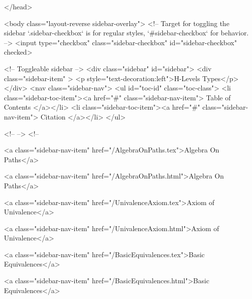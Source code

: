   
</head>




  <body class="layout-reverse sidebar-overlay">
    <!-- Target for toggling the sidebar `.sidebar-checkbox` is for regular
     styles, `#sidebar-checkbox` for behavior. -->
<input type="checkbox" class="sidebar-checkbox" id="sidebar-checkbox" checked>

<!-- Toggleable sidebar -->
<div class="sidebar" id="sidebar">
  <div class="sidebar-item" >
    <p style="text-decoration:left">H-Levels Types</p>
  </div>
  <nav class="sidebar-nav">
    <ul id="toc-id" class="toc-class">
  <li class="sidebar-toc-item"><a href="#" class="sidebar-nav-item"> Table of Contents </a></li>
  <li class="sidebar-toc-item"><a href="#" class="sidebar-nav-item"> Citation </a></li>
</ul>


    <!--  -->
    <!-- 
      
    
      
    
      
    
      
    
      
        
      
    
      
        
          <a class="sidebar-nav-item" href="/AlgebraOnPaths.tex">Algebra On Paths</a>
        
      
    
      
        
          <a class="sidebar-nav-item" href="/AlgebraOnPaths.html">Algebra On Paths</a>
        
      
    
      
        
          <a class="sidebar-nav-item" href="/UnivalenceAxiom.tex">Axiom of Univalence</a>
        
      
    
      
        
          <a class="sidebar-nav-item" href="/UnivalenceAxiom.html">Axiom of Univalence</a>
        
      
    
      
        
          <a class="sidebar-nav-item" href="/BasicEquivalences.tex">Basic Equivalences</a>
        
      
    
      
        
          <a class="sidebar-nav-item" href="/BasicEquivalences.html">Basic Equivalences</a>
        
